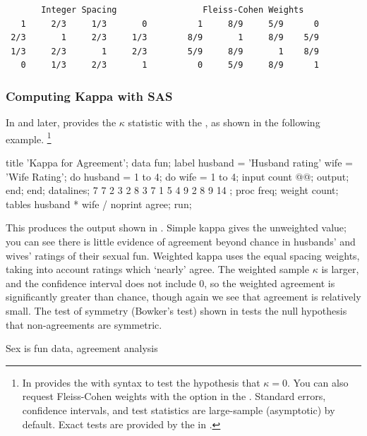 \begin{verbatim}
       Integer Spacing                 Fleiss-Cohen Weights
   1     2/3     1/3       0          1     8/9     5/9      0
 2/3       1     2/3     1/3        8/9       1     8/9    5/9
 1/3     2/3       1     2/3        5/9     8/9       1    8/9
   0     1/3     2/3       1          0     5/9     8/9      1
\end{verbatim}

\subsubsection{Computing Kappa with SAS}
In  and later, 
provides the $\kappa$ statistic with the , as shown in
the following example.%
\footnote{In  
provides 
the 
with syntax  to test the hypothesis that $\kappa = 0$.
You can also request Fleiss-Cohen weights with the option 
in the .
Standard errors, confidence intervals, and test statistics are large-sample (asymptotic)
by default.  Exact tests are provided by the 
in .}

\begin{listing}
title 'Kappa for Agreement';
data fun;
   label husband = 'Husband rating'
         wife    = 'Wife Rating';
   do husband = 1 to 4;
   do wife    = 1 to 4;
      input count @@;
      output;
      end; end;
datalines;
 7     7     2      3
 2     8     3      7
 1     5     4      9
 2     8     9     14
;
proc freq;
   weight count;
   tables husband * wife / noprint agree;
run;
\end{listing}

This produces the output shown in .
Simple kappa gives the unweighted value; you can see there is little
evidence of agreement beyond chance in husbands' and wives' ratings
of their sexual fun.
Weighted kappa uses the equal spacing weights, taking into account
ratings which `nearly' agree.  The weighted sample $\kappa$ is
larger, and the confidence interval does not include 0,
so the weighted agreement is significantly greater than chance,
though again we see that agreement is relatively small.
The test of symmetry (Bowker's test) shown in 
tests the null hypothesis that non-agreements are symmetric.
\begin{Output}
\caption{Sex is fun data, agreement analysis}\label{out:sexagree}
\small

\end{Output}

